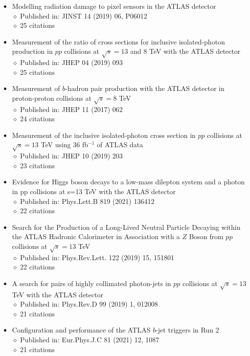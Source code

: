 \documentclass[margin, 10pt]{res} %
\begin{document}
\begin{resume}
\begin{itemize}
\item Modelling radiation damage to pixel sensors in the ATLAS detector\\
$\diamond$ Published in: JINST 14 (2019) 06, P06012\\
$\diamond$ 25 citations
\item Measurement of the ratio of cross sections for inclusive isolated-photon production in $pp$ collisions at $\sqrt{s} = 13$ and 8 TeV with the ATLAS detector\\
$\diamond$ Published in: JHEP 04 (2019) 093\\
$\diamond$ 25 citations
\item Measurement of $b$-hadron pair production with the ATLAS detector in proton-proton collisions at $\sqrt{s} = 8$ TeV\\
$\diamond$ Published in: JHEP 11 (2017) 062\\
$\diamond$ 24 citations
\item Measurement of the inclusive isolated-photon cross section in $pp$ collisions at $\sqrt{s} = 13$ TeV using 36 fb$^{-1}$ of ATLAS data\\
$\diamond$ Published in: JHEP 10 (2019) 203\\
$\diamond$ 23 citations
\item Evidence for Higgs boson decays to a low-mass dilepton system and a photon in pp collisions at s=13 TeV with the ATLAS detector\\
$\diamond$ Published in: Phys.Lett.B 819 (2021) 136412\\
$\diamond$ 22 citations
\item Search for the Production of a Long-Lived Neutral Particle Decaying within the ATLAS Hadronic Calorimeter in Association with a $Z$ Boson from $pp$ collisions at $\sqrt{s} = 13$ TeV\\
$\diamond$ Published in: Phys.Rev.Lett. 122 (2019) 15, 151801\\
$\diamond$ 22 citations
\item A search for pairs of highly collimated photon-jets in $pp$ collisions at $\sqrt{s} = 13$ TeV with the ATLAS detector\\
$\diamond$ Published in: Phys.Rev.D 99 (2019) 1, 012008\\
$\diamond$ 21 citations
\item Configuration and performance of the ATLAS $b$-jet triggers in Run 2\\
$\diamond$ Published in: Eur.Phys.J.C 81 (2021) 12, 1087\\
$\diamond$ 21 citations

\end{itemize}
\end{resume}
\end{document}

